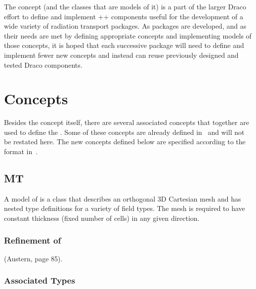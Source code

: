 \documentclass[11pt]{rnote}
\begin{document}
The  concept (and the classes that are models of it) is a
part of the larger Draco effort to define and implement \C++ components 
useful for the development of a wide variety of radiation transport
packages. As packages are developed, and as their needs are met by
defining appropriate concepts and implementing models of those
concepts, it is hoped that each successive package will need to define 
and implement fewer new concepts and instead can reuse previously
designed and tested Draco components.

\section{Concepts}

Besides the  concept itself, there are several associated
concepts that together are used to define the . Some of
these concepts are already defined in~\cite{au99} and will not be restated
here. The new concepts defined below are specified according to the
format in~\cite{au99}.

\subsection{MT}
A model of  is a class that describes an orthogonal 3D
Cartesian mesh and has nested type definitions for a variety of field
types. The mesh is required to have constant thickness (fixed number
of cells) in any given direction.

\subsubsection{Refinement of}
 (Austern, page 85).

\subsubsection{Associated Types}
\end{document}
